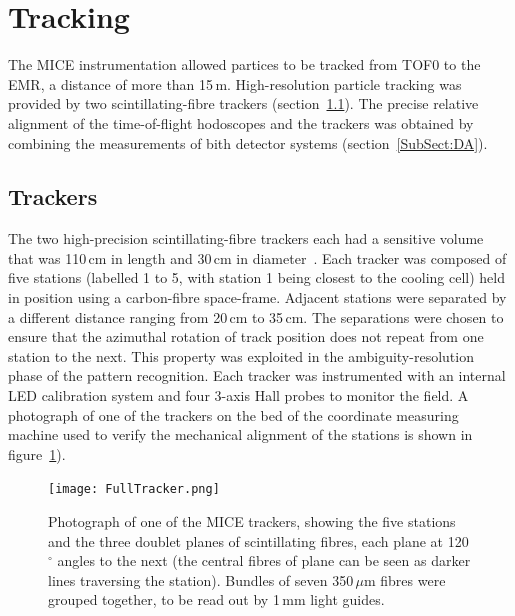 \graphicspath{{06-Tracking/Figures/}}

\section{Tracking}
\label{Sect:Tracking}

The MICE instrumentation allowed partices to be tracked from TOF0 to
the EMR, a distance of more than 15\,m.
High-resolution particle tracking was provided by two
scintillating-fibre trackers (section~\ref{SubSect:Tracker}).
The precise relative alignment of the time-of-flight hodoscopes and
the trackers was obtained by combining the measurements of bith
detector systems (section~\ref{SubSect:DA}). 

\subsection{Trackers}
\label{SubSect:Tracker}

The two high-precision scintillating-fibre trackers each had a
sensitive volume that was 110\,cm in length and 30\,cm in
diameter~\cite{Ellis:2010bb}.
Each tracker was composed of five stations (labelled 1 to 5, with
station 1 being closest to the cooling cell) held in position using a
carbon-fibre space-frame.  
Adjacent stations were separated by a different distance ranging from
20\,cm to 35\,cm.
The separations were chosen to ensure that the azimuthal rotation of
track position does not repeat from one station to the next.
This property was exploited in the ambiguity-resolution phase of the
pattern recognition.
Each tracker was instrumented with an internal LED calibration system
and four 3-axis Hall probes to monitor the field.
A photograph of one of the trackers on the bed of the coordinate
measuring machine used to verify the mechanical alignment of the
stations is shown in figure~\ref{Figure:FullTracker}).
\begin{figure}
  \begin{center}
    \texttt{[image: FullTracker.png]}
  \end{center}
  \caption{
    Photograph of one of the MICE trackers, showing the five stations
    and the three doublet planes of scintillating fibres, each plane
    at 120$^\circ$ angles to the next (the central fibres of plane can
    be seen as darker lines traversing the station).
    Bundles of seven 350\,$\mu$m fibres were grouped together, to be
    read out by 1\,mm light guides.
  }
  \label{Figure:FullTracker}
\end{figure}

